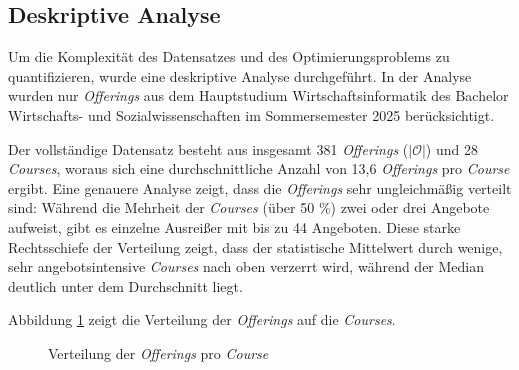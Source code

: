 \subsection{Deskriptive Analyse}\label{chap:deskriptive_analyse}

Um die Komplexität des Datensatzes und des Optimierungsproblems zu quantifizieren, wurde eine deskriptive Analyse durchgeführt. In der Analyse wurden nur \textit{Offerings} aus dem Hauptstudium Wirtschaftsinformatik des Bachelor Wirtschafts- und Sozialwissenschaften im Sommersemester 2025 berücksichtigt.

Der vollständige Datensatz besteht aus insgesamt 381 \textit{Offerings} ($|\mathcal{O}|$) und 28 \textit{Courses}, woraus sich eine durchschnittliche Anzahl von 13{,}6 \textit{Offerings} pro \textit{Course} ergibt. Eine genauere Analyse zeigt, dass die \textit{Offerings} sehr ungleichmäßig verteilt sind: Während die Mehrheit der \textit{Courses} (über 50 \%) zwei oder drei Angebote aufweist, gibt es einzelne Ausreißer mit bis zu 44 Angeboten. Diese starke Rechtsschiefe der Verteilung zeigt, dass der statistische Mittelwert durch wenige, sehr angebotsintensive \textit{Courses} nach oben verzerrt wird, während der Median deutlich unter dem Durchschnitt liegt.

Abbildung \ref{fig:descriptive_analysis_offerings_per_course} zeigt die Verteilung der \textit{Offerings} auf die \textit{Courses}.


\begin{figure}[H]
  \centering
  \caption{Verteilung der \textit{Offerings} pro \textit{Course}}
  \label{fig:descriptive_analysis_offerings_per_course}
\end{figure}



